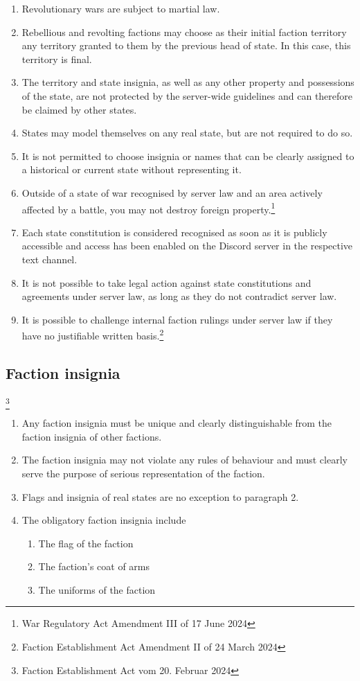 \documentclass{article}
\begin{document}
\begin{enumerate}[(1)]
	\item Revolutionary wars are subject to martial law.
	\item Rebellious and revolting factions may choose as their initial faction territory any territory granted to them by the previous head of state. In this case, this territory is final.
    \item The territory and state insignia, as well as any other property and possessions of the state, are not protected by the server-wide guidelines and can therefore be claimed by other states.
    \item States may model themselves on any real state, but are not required to do so.
    \item It is not permitted to choose insignia or names that can be clearly assigned to a historical or current state without representing it.	
    \item Outside of a state of war recognised by server law and an area actively affected by a battle, you may not destroy foreign property.\footnote{War Regulatory Act Amendment III of 17 June 2024}
    \item Each state constitution is considered recognised as soon as it is publicly accessible and access has been enabled on the Discord server in the respective text channel.
    \item It is not possible to take legal action against state constitutions and agreements under server law, as long as they do not contradict server law.
    \item It is possible to challenge internal faction rulings under server law if they have no justifiable written basis.\footnote{Faction Establishment Act Amendment II of 24 March 2024}
\end{enumerate}

\subsection{Faction insignia}\footnote{Faction Establishment Act vom 20. Februar 2024}
\begin{enumerate}[(1)]
    \item Any faction insignia must be unique and clearly distinguishable from the faction insignia of other factions.
    \item The faction insignia may not violate any rules of behaviour and must clearly serve the purpose of serious representation of the faction.
    \item Flags and insignia of real states are no exception to paragraph 2.
    \item The obligatory faction insignia include
    \begin{enumerate}[1.]
        \item The flag of the faction
        \item The faction's coat of arms
        \item The uniforms of the faction
    \end{enumerate}
\end{enumerate}
\end{document}
